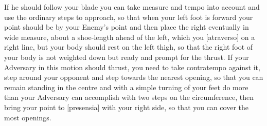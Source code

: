 
If he should follow your blade you can take measure and tempo into
account and use the ordinary steps to approach, so that when your left
foot is forward your point should be by your Enemy's point and then
place the right eventually in wide measure, about a shoe-length
ahead of the left, which you [atraverso] on a right
line, but your body should rest on the left thigh, so that the right
foot of your body is not weighted down but ready and prompt for the
thrust. If your Adversary in this motion should thrust, you need to
take contratempo against it, step around your opponent and step
towards the nearest opening, so that you can remain standing in the
centre and with a simple turning of your feet do more than your
Adversary can accomplish with two steps on the circumference, then
bring your point to [presensia] with your right side, so that you can
cover the most openings.



